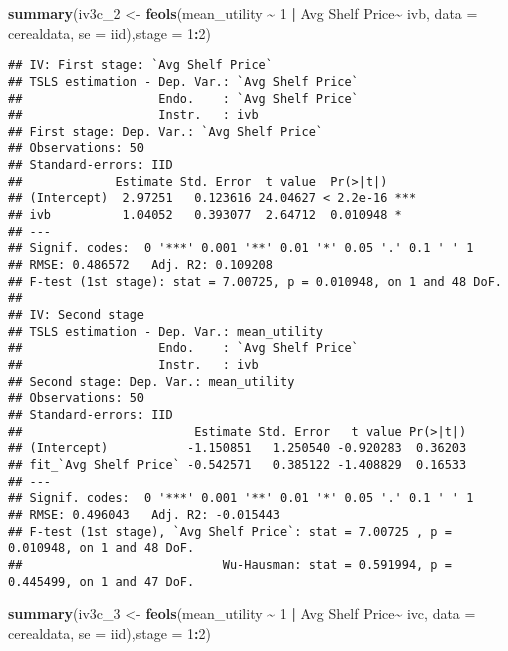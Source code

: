\documentclass[
]{article}
\newenvironment{Shaded}{\begin{snugshade}}{\end{snugshade}}
\newcommand{\AttributeTok}[1]{\textcolor[rgb]{0.13,0.29,0.53}{#1}}
\newcommand{\DecValTok}[1]{\textcolor[rgb]{0.00,0.00,0.81}{#1}}
\newcommand{\FunctionTok}[1]{\textcolor[rgb]{0.13,0.29,0.53}{\textbf{#1}}}
\newcommand{\NormalTok}[1]{#1}
\newcommand{\OtherTok}[1]{\textcolor[rgb]{0.56,0.35,0.01}{#1}}
\newcommand{\SpecialCharTok}[1]{\textcolor[rgb]{0.81,0.36,0.00}{\textbf{#1}}}
\newcommand{\StringTok}[1]{\textcolor[rgb]{0.31,0.60,0.02}{#1}}
\begin{document}
\begin{Shaded}
\begin{Highlighting}[]
\FunctionTok{summary}\NormalTok{(iv3c\_2 }\OtherTok{\textless{}{-}} \FunctionTok{feols}\NormalTok{(mean\_utility }\SpecialCharTok{\textasciitilde{}} \DecValTok{1} \SpecialCharTok{|}  \StringTok{\textasciigrave{}}\AttributeTok{Avg Shelf Price}\StringTok{\textasciigrave{}}\SpecialCharTok{\textasciitilde{}}\NormalTok{ ivb, }\AttributeTok{data =}\NormalTok{ cerealdata,}
                     \AttributeTok{se =} \StringTok{\textquotesingle{}iid\textquotesingle{}}\NormalTok{),}\AttributeTok{stage =} \DecValTok{1}\SpecialCharTok{:}\DecValTok{2}\NormalTok{)}
\end{Highlighting}
\end{Shaded}

\begin{verbatim}
## IV: First stage: `Avg Shelf Price`
## TSLS estimation - Dep. Var.: `Avg Shelf Price`
##                   Endo.    : `Avg Shelf Price`
##                   Instr.   : ivb
## First stage: Dep. Var.: `Avg Shelf Price`
## Observations: 50
## Standard-errors: IID 
##             Estimate Std. Error  t value  Pr(>|t|)    
## (Intercept)  2.97251   0.123616 24.04627 < 2.2e-16 ***
## ivb          1.04052   0.393077  2.64712  0.010948 *  
## ---
## Signif. codes:  0 '***' 0.001 '**' 0.01 '*' 0.05 '.' 0.1 ' ' 1
## RMSE: 0.486572   Adj. R2: 0.109208
## F-test (1st stage): stat = 7.00725, p = 0.010948, on 1 and 48 DoF.
## 
## IV: Second stage
## TSLS estimation - Dep. Var.: mean_utility
##                   Endo.    : `Avg Shelf Price`
##                   Instr.   : ivb
## Second stage: Dep. Var.: mean_utility
## Observations: 50
## Standard-errors: IID 
##                        Estimate Std. Error   t value Pr(>|t|) 
## (Intercept)           -1.150851   1.250540 -0.920283  0.36203 
## fit_`Avg Shelf Price` -0.542571   0.385122 -1.408829  0.16533 
## ---
## Signif. codes:  0 '***' 0.001 '**' 0.01 '*' 0.05 '.' 0.1 ' ' 1
## RMSE: 0.496043   Adj. R2: -0.015443
## F-test (1st stage), `Avg Shelf Price`: stat = 7.00725 , p = 0.010948, on 1 and 48 DoF.
##                            Wu-Hausman: stat = 0.591994, p = 0.445499, on 1 and 47 DoF.
\end{verbatim}

\begin{Shaded}
\begin{Highlighting}[]
\FunctionTok{summary}\NormalTok{(iv3c\_3 }\OtherTok{\textless{}{-}} \FunctionTok{feols}\NormalTok{(mean\_utility }\SpecialCharTok{\textasciitilde{}} \DecValTok{1} \SpecialCharTok{|}  \StringTok{\textasciigrave{}}\AttributeTok{Avg Shelf Price}\StringTok{\textasciigrave{}}\SpecialCharTok{\textasciitilde{}}\NormalTok{ ivc, }\AttributeTok{data =}\NormalTok{ cerealdata,}
                     \AttributeTok{se =} \StringTok{\textquotesingle{}iid\textquotesingle{}}\NormalTok{),}\AttributeTok{stage =} \DecValTok{1}\SpecialCharTok{:}\DecValTok{2}\NormalTok{)}
\end{Highlighting}
\end{Shaded}
\end{document}

